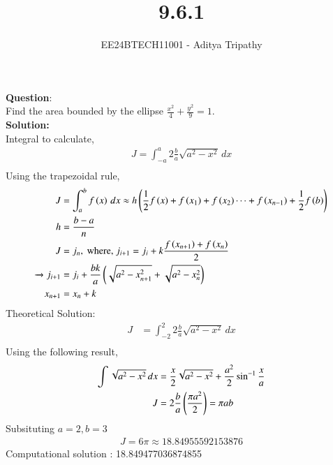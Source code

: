 \documentclass[journal]{IEEEtran}
\begin{document}

\vspace{3cm}

\title{9.6.1}
\author{EE24BTECH11001 - Aditya Tripathy}
 \maketitle
{\let\newpage\relax\maketitle}

\renewcommand{\thefigure}{\theenumi}
\renewcommand{\thetable}{\theenumi}
\setlength{\intextsep}{10pt} %


\renewcommand{\thetable}{\theenumi}


\textbf{Question}:\\
Find the area bounded by the ellipse $\frac{x^2}{4} + \frac{y^2}{9} = 1$.
\\
\textbf{Solution: }\\
Integral to calculate, 
\begin{align}
    J = \int_{-a}^{a}  2\frac{b}{a}\sqrt{a^2 - {x}^2} \, dx\\
\end{align}
Using the trapezoidal rule,
\begin{align}
    J &= \int_a^b f\left(x\right)\, dx \approx h\left(\frac{1}{2}f\left(x\right) + f\left(x_1\right) + f\left(x_2\right) \cdots + f\left(x_{n-1}\right) + \frac{1}{2}f\left(b\right)\right)\\
    h &= \frac{b-a}{n}\\
    J &= j_n, \text{ where, } j_{i + 1} = j_i + k\frac{f\left(x_{n+1}\right) + f\left(x_n\right)}{2}\\ 
    \xrightarrow{} j_{i + 1} &= j_i + \frac{bk}{a}\left(\sqrt{a^2 - x_{n+1}^2} + \sqrt{a^2 - x_n^2}\right)\\
    x_{n+1} &= x_n + k
\end{align}
Theoretical Solution:
\begin{align}
    J &= \int_{-2}^{2}  2\frac{b}{a}\sqrt{a^2 - {x}^2} \, dx\\
\end{align}
Using the following result, 
\begin{align}
    \int \sqrt{a^2 - x^2} \, dx &= \frac{x}{2} \sqrt{a^2 - x^2} + \frac{a^2}{2}\sin ^{-1} \frac{x}{a}\\ 
    J &= 2\frac{b}{a} \left(\frac{\pi a^2}{2}\right) = \pi ab
\end{align}
Subsituting $a = 2, b = 3$
\begin{align}
   J = 6\pi \approx 18.84955592153876
\end{align}
Computational solution : 18.849477036874855
\end{document}

